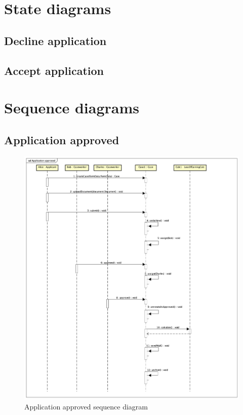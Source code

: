 \newpage
\section{State diagrams}

\subsection{Decline application}

\subsection{Accept application}

\newpage
\section{Sequence diagrams}
\subsection{Application approved}
\begin{figure}[htb!]
    \centering
    \includegraphics[width=\textwidth]{img/sd-application-approved.png}
    \caption{Application approved sequence diagram}
    \label{fig:my_label}
\end{figure}


